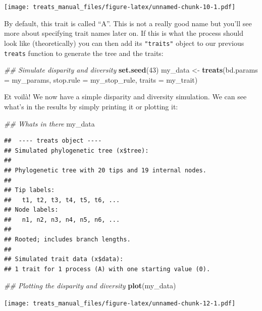 \documentclass[
]{book}
\newenvironment{Shaded}{\begin{snugshade}}{\end{snugshade}}
\newcommand{\CommentTok}[1]{\textcolor[rgb]{0.56,0.35,0.01}{\textit{#1}}}
\newcommand{\DataTypeTok}[1]{\textcolor[rgb]{0.13,0.29,0.53}{#1}}
\newcommand{\DecValTok}[1]{\textcolor[rgb]{0.00,0.00,0.81}{#1}}
\newcommand{\KeywordTok}[1]{\textcolor[rgb]{0.13,0.29,0.53}{\textbf{#1}}}
\newcommand{\NormalTok}[1]{#1}
\newcommand{\StringTok}[1]{\textcolor[rgb]{0.31,0.60,0.02}{#1}}
\begin{document}
\texttt{[image: treats\_manual\_files/figure-latex/unnamed-chunk-10-1.pdf]}

By default, this trait is called ``A''.
This is not a really good name but you'll see more about specifying trait names later on.
If this is what the process should look like (theoretically) you can then add its \texttt{"traits"} object to our previous \texttt{treats} function to generate the tree and the traits:

\begin{Shaded}
\begin{Highlighting}[]
\CommentTok{\#\# Simulate disparity and diversity}
\KeywordTok{set.seed}\NormalTok{(}\DecValTok{43}\NormalTok{)}
\NormalTok{my\_data \textless{}{-}}\StringTok{ }\KeywordTok{treats}\NormalTok{(}\DataTypeTok{bd.params =}\NormalTok{ my\_params,}
                  \DataTypeTok{stop.rule =}\NormalTok{ my\_stop\_rule,}
                  \DataTypeTok{traits    =}\NormalTok{ my\_trait)}
\end{Highlighting}
\end{Shaded}

Et voilà! We now have a simple disparity and diversity simulation.
We can see what's in the results by simply printing it or plotting it:

\begin{Shaded}
\begin{Highlighting}[]
\CommentTok{\#\# What\textquotesingle{}s in there}
\NormalTok{my\_data}
\end{Highlighting}
\end{Shaded}

\begin{verbatim}
##  ---- treats object ---- 
## Simulated phylogenetic tree (x$tree):
## 
## Phylogenetic tree with 20 tips and 19 internal nodes.
## 
## Tip labels:
##   t1, t2, t3, t4, t5, t6, ...
## Node labels:
##   n1, n2, n3, n4, n5, n6, ...
## 
## Rooted; includes branch lengths.
## 
## Simulated trait data (x$data):
## 1 trait for 1 process (A) with one starting value (0).
\end{verbatim}

\begin{Shaded}
\begin{Highlighting}[]
\CommentTok{\#\# Plotting the disparity and diversity}
\KeywordTok{plot}\NormalTok{(my\_data)}
\end{Highlighting}
\end{Shaded}

\texttt{[image: treats\_manual\_files/figure-latex/unnamed-chunk-12-1.pdf]}
\end{document}
